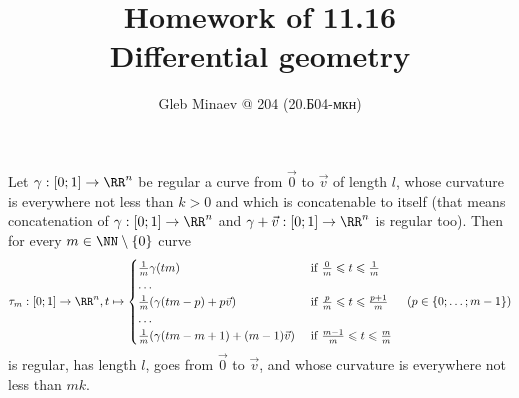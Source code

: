 \documentclass[12pt,a4paper]{article}
\title{Homework of 11.16\\Differential geometry}
\author{Gleb Minaev @ 204 (20.Б04-мкн)}
\date{}
\begin{document}
    \maketitle

    \begin{problem}{72}
        \begin{lemma}
            Let $\gamma: [0; 1] \to \RR^n$ be regular a curve from $\vec{0}$ to $\vec{v}$ of length $l$, whose curvature is everywhere not less than $k > 0$ and which is concatenable to itself (that means concatenation of $\gamma: [0; 1] \to \RR^n$ and $\gamma + \vec{v}: [0; 1] \to \RR^n$ is regular too). Then for every $m \in \NN \setminus \{0\}$ curve
            \[
                \tau_m: [0; 1] \to \RR^n, t \mapsto
                \begin{cases}
                    \frac{1}{m}\gamma(tm)& \text{ if } \frac{0}{m} \leqslant t \leqslant \frac{1}{m}\\
                    \dots\\
                    \frac{1}{m}(\gamma(tm - p) + p\vec{v})& \text{ if } \frac{p}{m} \leqslant t \leqslant \frac{p+1}{m}\\
                    \dots\\
                    \frac{1}{m}(\gamma(tm - m + 1) + (m-1)\vec{v})& \text{ if } \frac{m-1}{m} \leqslant t \leqslant \frac{m}{m}
                \end{cases}
                \quad (p \in \{0; \dots; m-1\})
            \]
            is regular, has length $l$, goes from $\vec{0}$ to $\vec{v}$, and whose curvature is everywhere not less than $mk$.
        \end{lemma}


\end{problem}
\end{document}
